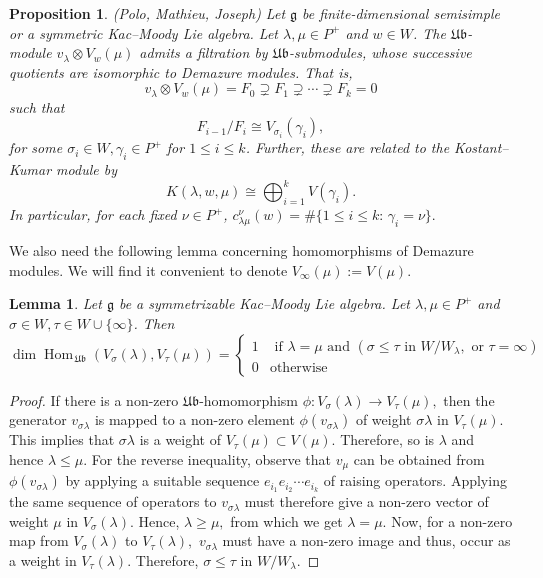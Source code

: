 \documentclass[12pt,reqno]{amsart}
\theoremstyle{plain}
\newtheorem{lemma}[theorem]{Lemma}
\newtheorem{proposition}[theorem]{Proposition}
\theoremstyle{definition}
\theoremstyle{remark}
\theoremstyle{plain}
\DeclareMathOperator{\Hom}{Hom}
\begin{document}
\begin{proposition} \label{prop:excellent-joseph} (Polo, Mathieu, Joseph)
    Let $\mathfrak{g}$ be finite-dimensional semisimple or a symmetric Kac--Moody Lie algebra. Let $\lambda, \mu \in P^+$ and $w \in W$. The $\mathfrak{Ub}$-module $v_\lambda\otimes V_w(\mu)$ admits a filtration by $\mathfrak{Ub}$-submodules, whose successive quotients are isomorphic to Demazure modules. That is,
    $$v_\lambda\otimes V_w(\mu)=F_0\supsetneq F_1\supsetneq \cdots \supsetneq F_k = 0$$ such that $$F_{i-1}/F_{i}\cong V_{\sigma_i}(\gamma_i),$$ for some $\sigma_i\in W, \gamma_i\in P^+$ for $1 \leq i \leq k$. 
    Further, these are related to the Kostant--Kumar module by
    $$K(\lambda,w,\mu) \cong \bigoplus_{i=1}^k V(\gamma_i).$$ 
    In particular, for each fixed $\nu \in P^+$, $c_{\lambda\mu}^{\nu}(w) = \#\{1 \leq i \leq k :\, \gamma_i=\nu\}.$
\end{proposition}
We also need the following lemma concerning homomorphisms of Demazure modules. We will find   it convenient to denote $V_{\infty}(\mu):=V(\mu).$
\begin{lemma}\label{lem:demhom}
 Let $\mathfrak g$ be a symmetrizable Kac--Moody Lie algebra. Let $\lambda, \mu \in P^+$ and $\sigma \in W, \tau \in W\cup\{\infty\}$. Then 
\begin{equation*}
     \dim \Hom_{\,\mathfrak{Ub}}(V_\sigma(\lambda),V_\tau(\mu))=
    \begin{cases}
      1 & \text{ if } \lambda=\mu \text{ and } (\sigma\leq \tau \text{ in } W/W_\lambda, \text{ or } \tau=\infty)\\
      0       & \text{otherwise}
    \end{cases}
  \end{equation*}
\end{lemma}
\begin{proof}
    If there is a non-zero $\mathfrak{Ub}$-homomorphism $\phi: V_\sigma(\lambda) \to V_\tau(\mu),$ then the generator $v_{\sigma\lambda}$ is mapped to a non-zero element $\phi(v_{\sigma\lambda})$ of weight $\sigma\lambda$ in $V_\tau(\mu)$. This implies that $\sigma\lambda$ is a weight of $V_\tau(\mu) \subset V(\mu).$ Therefore, so is $\lambda$ and hence $\lambda\le \mu.$ For the reverse inequality, observe that $v_\mu$ can be obtained from $\phi(v_{\sigma\lambda})$ by applying a suitable sequence $e_{i_1} e_{i_2} \cdots e_{i_k}$ of raising operators. Applying the same sequence of operators to $v_{\sigma\lambda}$ must therefore give a non-zero vector of weight $\mu$ in $V_{\sigma}(\lambda).$ Hence, $\lambda\ge \mu,$ from which we get $\lambda=\mu.$ Now, for a non-zero map from $V_\sigma(\lambda)$ to $V_{\tau}(\lambda),$ $v_{\sigma\lambda}$ must have a non-zero image and thus, occur as a weight in $V_\tau(\lambda).$ Therefore, $\sigma\le \tau$ in $W/W_\lambda$.
\end{proof}
\end{document}
